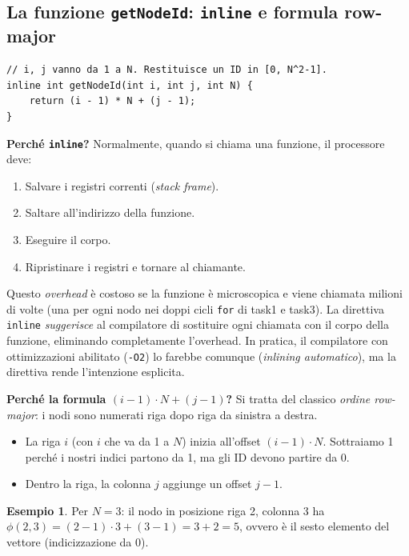 \documentclass[a4paper,11pt]{article}
\theoremstyle{definition}
\newtheorem{esempio}{Esempio}[section]
\begin{document}
\subsection{La funzione \texttt{getNodeId}: \texttt{inline} e formula row-major}

\begin{lstlisting}[style=cpp, caption={Mappatura 2D $\to$ 1D, funzione inline}]
// i, j vanno da 1 a N. Restituisce un ID in [0, N^2-1].
inline int getNodeId(int i, int j, int N) {
    return (i - 1) * N + (j - 1);
}
\end{lstlisting}

\textbf{Perché \texttt{inline}?} Normalmente, quando si chiama una funzione, il processore deve:
\begin{enumerate}
  \item Salvare i registri correnti (\emph{stack frame}).
  \item Saltare all'indirizzo della funzione.
  \item Eseguire il corpo.
  \item Ripristinare i registri e tornare al chiamante.
\end{enumerate}
Questo \emph{overhead} è costoso se la funzione è microscopica e viene chiamata milioni di volte (una per ogni nodo nei doppi cicli \texttt{for} di task1 e task3). La direttiva \texttt{inline} \emph{suggerisce} al compilatore di sostituire ogni chiamata con il corpo della funzione, eliminando completamente l'overhead. In pratica, il compilatore con ottimizzazioni abilitato (\texttt{-O2}) lo farebbe comunque (\emph{inlining automatico}), ma la direttiva rende l'intenzione esplicita.

\textbf{Perché la formula $(i-1) \cdot N + (j-1)$?} Si tratta del classico \emph{ordine row-major}: i nodi sono numerati riga dopo riga da sinistra a destra.
\begin{itemize}
  \item La riga $i$ (con $i$ che va da 1 a $N$) inizia all'offset $(i-1) \cdot N$. Sottraiamo 1 perché i nostri indici partono da 1, ma gli ID devono partire da 0.
  \item Dentro la riga, la colonna $j$ aggiunge un offset $j-1$.
\end{itemize}

\begin{esempio}
Per $N=3$: il nodo in posizione riga 2, colonna 3 ha $\phi(2,3) = (2-1)\cdot3 + (3-1) = 3 + 2 = 5$, ovvero è il sesto elemento del vettore (indicizzazione da 0).
\end{esempio}
\end{document}

